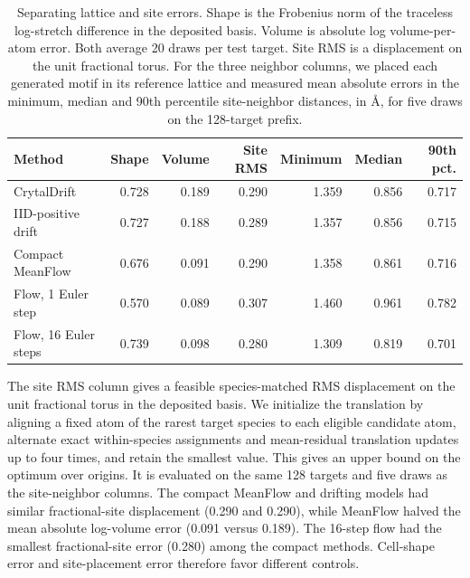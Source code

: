 \begin{table}[!htbp]\centering\small
\caption{Separating lattice and site errors. Shape is the Frobenius norm of the traceless log-stretch difference in the deposited basis. Volume is absolute log volume-per-atom error. Both average 20 draws per test target. Site RMS is a displacement on the unit fractional torus. For the three neighbor columns, we placed each generated motif in its reference lattice and measured mean absolute errors in the minimum, median and 90th percentile site-neighbor distances, in \AA, for five draws on the 128-target prefix.}\label{t:exp-shape}
\begin{tabular}{lrrrrrr}\hline Method & Shape & Volume & Site RMS & Minimum & Median & 90th pct.\\\hline
CrytalDrift & 0.728 & 0.189 & 0.290 & 1.359 & 0.856 & 0.717 \\
IID-positive drift & 0.727 & 0.188 & 0.289 & 1.357 & 0.856 & 0.715 \\
Compact MeanFlow & 0.676 & 0.091 & 0.290 & 1.358 & 0.861 & 0.716 \\
Flow, 1 Euler step & 0.570 & 0.089 & 0.307 & 1.460 & 0.961 & 0.782 \\
Flow, 16 Euler steps & 0.739 & 0.098 & 0.280 & 1.309 & 0.819 & 0.701 \\
\hline\end{tabular}\end{table}
The site RMS column gives a feasible species-matched RMS displacement on the unit fractional torus in the deposited basis. We initialize the translation by aligning a fixed atom of the rarest target species to each eligible candidate atom, alternate exact within-species assignments and mean-residual translation updates up to four times, and retain the smallest value. This gives an upper bound on the optimum over origins. It is evaluated on the same 128 targets and five draws as the site-neighbor columns.
The compact MeanFlow and drifting models had similar fractional-site displacement (0.290 and 0.290), while MeanFlow halved the mean absolute log-volume error (0.091 versus 0.189). The 16-step flow had the smallest fractional-site error (0.280) among the compact methods. Cell-shape error and site-placement error therefore favor different controls.
